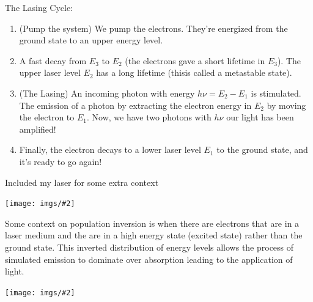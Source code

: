 \documentclass[10pt]{article}
\newcommand*{\pic}[2]{
    \begin{center}
        \texttt{[image: imgs/\#2]}
    \end{center}
}
\begin{document}
The Lasing Cycle:
\begin{enumerate}
    \item (Pump the system) We pump the electrons. They're energized from the ground state to an upper energy level.
    \item A fast decay from $E_3$ to $E_2$ (the electrons gave a short lifetime in $E_3$). The upper laser level $E_2$ has a long lifetime (thisis called a metastable state).
    \item (The Lasing) An incoming photon with energy $h \nu = E_2 - E_1$ is stimulated. The emission of a photon by extracting the electron energy in $E_2$ by moving the electron to $E_1$. Now, we have two photons with $h \nu$ our light has been amplified!
    \item Finally, the electron decays to a lower laser level $E_1$ to the ground state, and it's ready to go again!
\end{enumerate}
\newpage
Included my laser for some extra context
\pic{.2}{my-laser.jpeg}

Some context on population inversion is when there are electrons that are in a laser medium and the are in a high energy state (excited state) rather than the ground state. This inverted distribution of energy levels allows the process of simulated emission to dominate over absorption leading to the application of light.

\pic{.7}{laZZY.png}
\end{document}
